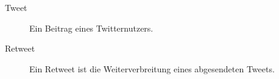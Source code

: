 
\begin{description}
	\item[Tweet] Ein Beitrag eines Twitternutzers.
	\item[Retweet] Ein Retweet ist die Weiterverbreitung eines abgesendeten Tweets.
\end{description}
